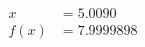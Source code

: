 \documentclass[preview]{standalone}
\begin{document}
\begin{align*}
x &= 5.0090\\f(x) &= 7.9999898
\end{align*}
\end{document}
